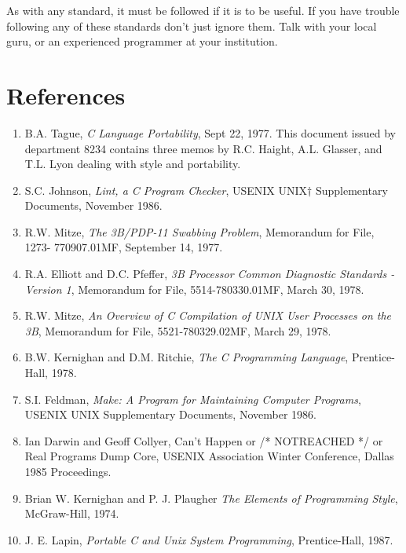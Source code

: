  As with any standard, it must be followed if it is to be useful. If you have
trouble following any of these standards don't just ignore them. Talk with
your local guru, or an experienced programmer at your institution. 

\newpage
\appendix
\section
{References}
\begin{enumerate}
\item B.A. Tague, {\em C Language Portability}, Sept 22, 1977. This document
issued by department 8234 contains three memos by R.C. Haight, A.L. Glasser,
and T.L. Lyon dealing with  style and portability. 

\item S.C. Johnson, {\em Lint, a C Program Checker}, USENIX UNIX$\dagger$
Supplementary Documents,  November 1986. 

\item R.W. Mitze, {\em The 3B/PDP-11 Swabbing Problem}, Memorandum for File, 1273- 
770907.01MF, September 14, 1977. 

\item R.A. Elliott and D.C. Pfeffer, {\em 3B Processor Common Diagnostic
Standards - Version 1},  Memorandum for File, 5514-780330.01MF, March 30, 1978. 

\item R.W. Mitze, {\em  An Overview of C Compilation of UNIX User Processes on
the 3B}, Memorandum for File, 5521-780329.02MF, March 29, 1978. 

\item B.W. Kernighan and D.M. Ritchie, {\em The C Programming Language},
Prentice-Hall, 1978. 

\item S.I. Feldman, {\em Make: A Program for Maintaining Computer Programs},
USENIX UNIX Supplementary Documents, November 1986. 

\item Ian Darwin and Geoff Collyer, Can't Happen or /* NOTREACHED */ or Real
Programs Dump Core, USENIX Association Winter Conference, Dallas 1985
Proceedings. 

\item Brian W. Kernighan and P. J. Plaugher {\em The Elements of Programming
Style}, McGraw-Hill, 1974.

\item J. E. Lapin, {\em Portable C and Unix System Programming},
Prentice-Hall, 1987.
\end{enumerate}


